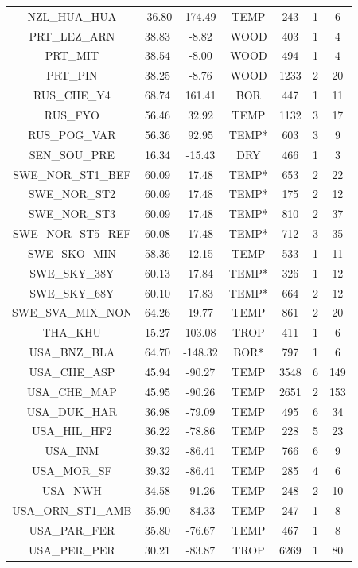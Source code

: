 \documentclass[11pt,twoside]{reedthesis}
\begin{document}
\begin{longtable}[t]{ccccccc}
NZL\_HUA\_HUA & -36.80 & 174.49 & TEMP & 243 & 1 & 6\\
PRT\_LEZ\_ARN & 38.83 & -8.82 & WOOD & 403 & 1 & 4\\
PRT\_MIT & 38.54 & -8.00 & WOOD & 494 & 1 & 4\\
PRT\_PIN & 38.25 & -8.76 & WOOD & 1233 & 2 & 20\\
RUS\_CHE\_Y4 & 68.74 & 161.41 & BOR & 447 & 1 & 11\\
RUS\_FYO & 56.46 & 32.92 & TEMP & 1132 & 3 & 17\\
RUS\_POG\_VAR & 56.36 & 92.95 & TEMP* & 603 & 3 & 9\\
SEN\_SOU\_PRE & 16.34 & -15.43 & DRY & 466 & 1 & 3\\
SWE\_NOR\_ST1\_BEF & 60.09 & 17.48 & TEMP* & 653 & 2 & 22\\
SWE\_NOR\_ST2 & 60.09 & 17.48 & TEMP* & 175 & 2 & 12\\
SWE\_NOR\_ST3 & 60.09 & 17.48 & TEMP* & 810 & 2 & 37\\
SWE\_NOR\_ST5\_REF & 60.08 & 17.48 & TEMP* & 712 & 3 & 35\\
SWE\_SKO\_MIN & 58.36 & 12.15 & TEMP & 533 & 1 & 11\\
SWE\_SKY\_38Y & 60.13 & 17.84 & TEMP* & 326 & 1 & 12\\
SWE\_SKY\_68Y & 60.10 & 17.83 & TEMP* & 664 & 2 & 12\\
SWE\_SVA\_MIX\_NON & 64.26 & 19.77 & TEMP & 861 & 2 & 20\\
THA\_KHU & 15.27 & 103.08 & TROP & 411 & 1 & 6\\
USA\_BNZ\_BLA & 64.70 & -148.32 & BOR* & 797 & 1 & 6\\
USA\_CHE\_ASP & 45.94 & -90.27 & TEMP & 3548 & 6 & 149\\
USA\_CHE\_MAP & 45.95 & -90.26 & TEMP & 2651 & 2 & 153\\
USA\_DUK\_HAR & 36.98 & -79.09 & TEMP & 495 & 6 & 34\\
USA\_HIL\_HF2 & 36.22 & -78.86 & TEMP & 228 & 5 & 23\\
USA\_INM & 39.32 & -86.41 & TEMP & 766 & 6 & 9\\
USA\_MOR\_SF & 39.32 & -86.41 & TEMP & 285 & 4 & 6\\
USA\_NWH & 34.58 & -91.26 & TEMP & 248 & 2 & 10\\
USA\_ORN\_ST1\_AMB & 35.90 & -84.33 & TEMP & 247 & 1 & 8\\
USA\_PAR\_FER & 35.80 & -76.67 & TEMP & 467 & 1 & 8\\
USA\_PER\_PER & 30.21 & -83.87 & TROP & 6269 & 1 & 80\\

\end{longtable}
\end{document}
